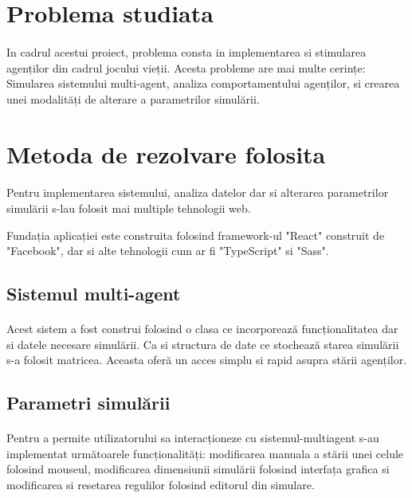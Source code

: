 \documentclass[11pt ,A4]{article}
\begin{document}
    \section{Problema studiata}

        \paragraph{}
        In cadrul acestui proiect, problema consta in implementarea si stimularea agenților din cadrul jocului vieții.
        Acesta probleme are mai multe cerințe: Simularea sistemului multi-agent, analiza comportamentului agenților, si crearea unei modalități de alterare a parametrilor simulării.
        

    \section{Metoda de rezolvare folosita}

        \paragraph{}
            Pentru implementarea sistemului, analiza datelor dar si alterarea parametrilor simulării s-lau folosit mai multiple tehnologii web.

            Fundația aplicației este construita folosind framework-ul "React" construit de "Facebook", dar si alte tehnologii cum ar fi "TypeScript" si "Sass".

        \subsection{Sistemul multi-agent}
            \paragraph{}
                Acest sistem a fost construi folosind o clasa ce incorporează funcționalitatea dar si datele necesare simulării.
                Ca si structura de date ce stochează starea simulării s-a folosit matricea. Aceasta oferă un acces simplu si rapid asupra stării agenților. 

        \subsection{Parametri simulării}
            \paragraph{}
                Pentru a permite utilizatorului sa interacționeze cu sistemul-multiagent s-au implementat următoarele funcționalități: modificarea manuala a stării unei celule folosind mouseul, modificarea dimensiunii simulării folosind interfața grafica si modificarea si resetarea regulilor folosind editorul din simulare.  
            
\end{document}
